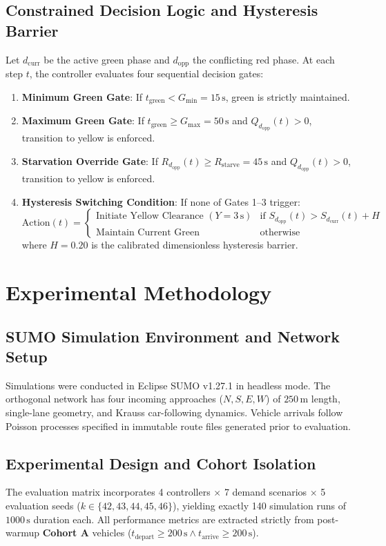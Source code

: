 \documentclass[11pt,journal,onecolumn]{article}
\begin{document}
\subsection{Constrained Decision Logic and Hysteresis Barrier}
Let $d_{\text{curr}}$ be the active green phase and $d_{\text{opp}}$ the conflicting red phase. At each step $t$, the controller evaluates four sequential decision gates:
\begin{enumerate}
    \item \textbf{Minimum Green Gate}: If $t_{\text{green}} < G_{\text{min}} = 15\,\text{s}$, green is strictly maintained.
    \item \textbf{Maximum Green Gate}: If $t_{\text{green}} \ge G_{\text{max}} = 50\,\text{s}$ and $Q_{d_{\text{opp}}}(t) > 0$, transition to yellow is enforced.
    \item \textbf{Starvation Override Gate}: If $R_{d_{\text{opp}}}(t) \ge R_{\text{starve}} = 45\,\text{s}$ and $Q_{d_{\text{opp}}}(t) > 0$, transition to yellow is enforced.
    \item \textbf{Hysteresis Switching Condition}: If none of Gates 1–3 trigger:
    \begin{equation}
        \text{Action}(t) = \begin{cases}
            \text{Initiate Yellow Clearance } (Y=3\,\text{s}) & \text{if } S_{d_{\text{opp}}}(t) > S_{d_{\text{curr}}}(t) + H \\
            \text{Maintain Current Green} & \text{otherwise}
        \end{cases}
    \end{equation}
    where $H = 0.20$ is the calibrated dimensionless hysteresis barrier.
\end{enumerate}

\section{Experimental Methodology}
\subsection{SUMO Simulation Environment and Network Setup}
Simulations were conducted in Eclipse SUMO v1.27.1 in headless mode. The orthogonal network has four incoming approaches ($N, S, E, W$) of $250\,\text{m}$ length, single-lane geometry, and Krauss car-following dynamics. Vehicle arrivals follow Poisson processes specified in immutable route files generated prior to evaluation.

\subsection{Experimental Design and Cohort Isolation}
The evaluation matrix incorporates 4 controllers $\times$ 7 demand scenarios $\times$ 5 evaluation seeds ($k \in \{42, 43, 44, 45, 46\}$), yielding exactly 140 simulation runs of $1000\,\text{s}$ duration each. All performance metrics are extracted strictly from post-warmup \textbf{Cohort A} vehicles ($t_{\text{depart}} \ge 200\,\text{s} \land t_{\text{arrive}} \ge 200\,\text{s}$).
\end{document}
